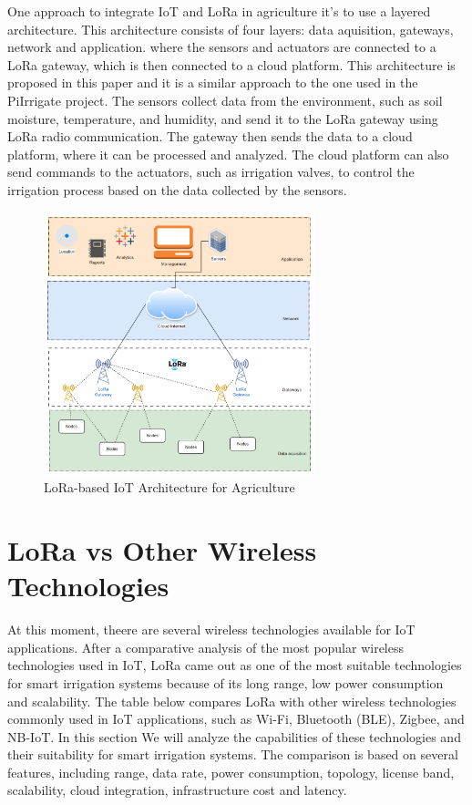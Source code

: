One approach to integrate IoT and LoRa in agriculture it's to use a layered architecture.
This architecture consists of four layers: data aquisition, gateways, network and application.
where the sensors and actuators are connected to a LoRa gateway, which is then connected to a cloud platform. 
This architecture is proposed in this paper \cite{loraBasedIoTPlatform} and it is a similar approach to the one used in the 
PiIrrigate project. The sensors collect data from the environment, such as soil moisture, temperature, and humidity,
and send it to the LoRa gateway using LoRa radio communication. The gateway then sends the data to a cloud platform, 
where it can be processed and analyzed. The cloud platform can also send commands to the actuators, such as irrigation valves, 
to control the irrigation process based on the data collected by the sensors. 

\begin{figure}[H]
    \centering
    \includegraphics[width=0.7\textwidth]{images/loraWan.png}
    \caption{LoRa-based IoT Architecture for Agriculture}
    \label{fig:lora_architecture}
\end{figure}

\section{LoRa vs Other Wireless Technologies}
At this moment, theere are several wireless technologies available for IoT applications. After a 
comparative analysis of the most popular wireless technologies used in IoT, LoRa came out as one of the most suitable
technologies for smart irrigation systems because of its long range, low power consumption and scalability.
The table below compares LoRa with other wireless technologies commonly used in IoT applications, such as Wi-Fi, Bluetooth (BLE), 
Zigbee, and NB-IoT. In this section We will analyze the capabilities of these technologies
and their suitability for smart irrigation systems. The comparison is based on several features, 
including range, data rate, power consumption, topology, license band, scalability, cloud integration, infrastructure cost and latency.

